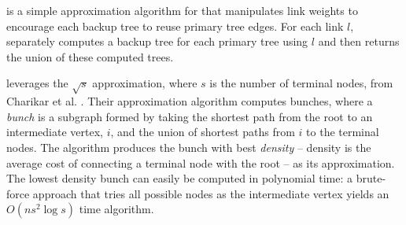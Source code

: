 \steiner is a simple approximation algorithm for \mc that manipulates link weights to encourage each backup tree to reuse primary tree edges.
For each link $l$,  \steiner separately computes a backup tree for each primary tree using $l$ and then returns the union of these computed trees. 


\steiner leverages the $\sqrt{s}$ \arbor approximation, where $s$ is the number of terminal nodes, from Charikar et al. \cite{Charikar98}. Their approximation algorithm computes bunches, 
where a \emph{bunch} is a subgraph formed by taking the shortest path from the root to an intermediate vertex, $i$, and the union of shortest paths from $i$ to the terminal nodes.  
The algorithm produces the bunch with best \emph{density} -- density is the average cost of connecting a terminal node with the root -- as its approximation.   The lowest density bunch can 
easily be computed in polynomial time: a brute-force approach that tries all possible nodes as the intermediate vertex yields an $O(ns^2 \log s)$ time algorithm. 




